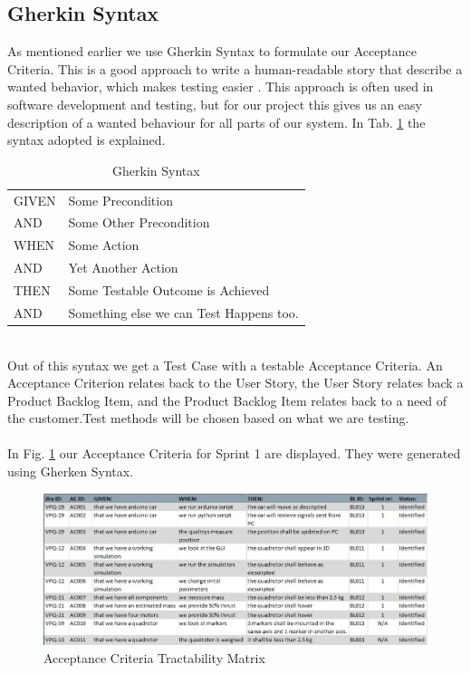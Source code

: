 \subsection{Gherkin Syntax}
As mentioned earlier we use Gherkin Syntax to formulate our Acceptance Criteria. This is a good approach to write a human-readable story that describe a wanted behavior, which makes testing easier \cite{ref7}. This approach is often used in software development and testing, but for our project this gives us an easy description of a wanted behaviour for all parts of our system. In Tab. \ref{tab:gherkin} the syntax adopted is explained. 
\begin {table}[h]
    \begin{center}
    \caption {Gherkin Syntax} 
    \label{tab:gherkin} 
    \begin{tabular}{|l|l|}\hline 
    GIVEN   &   Some Precondition \\ \rowcolor{gainsboro}
    AND    &   Some Other Precondition        \\
    WHEN    &   Some Action        \\ \rowcolor{gainsboro}
    AND    &   Yet Another Action        \\
    THEN    &   Some Testable Outcome is Achieved       \\ \rowcolor{gainsboro}
    AND    &   Something else we can Test Happens too.   \\
    \hline
    \end{tabular}
    \end{center}
\end{table}
\\
Out of this syntax we get a Test Case with a testable Acceptance Criteria. An Acceptance Criterion relates back to the User Story, the User Story relates back a Product Backlog Item, and the Product Backlog Item relates back to a need of the customer.Test methods will be chosen based on what we are testing.\\
\\
In Fig. \ref{fig:ACmatrix} our Acceptance Criteria for Sprint 1 are displayed. They were generated using Gherken Syntax.

\begin{figure}[h]
    \centering
        \includegraphics[width=1\textwidth]{VAPIQ-PICTURES/Capture2}
        \caption{Acceptance Criteria Tractability Matrix}
        \label{fig:ACmatrix}
\end{figure}


